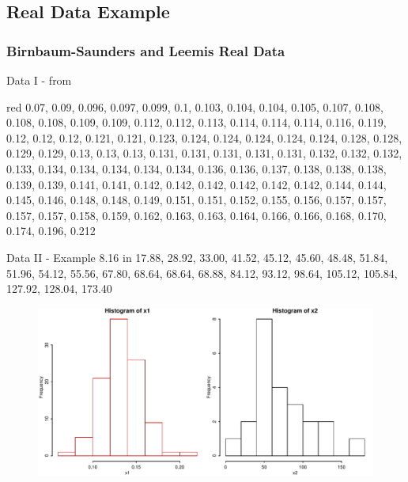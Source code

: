 \subsection{Real Data Example}
\begin{frame}
  \frametitle{Birnbaum-Saunders and Leemis Real Data}
\begin{footnotesize}
\begin{block}{Data I  - from  }
\begin{color}{red}
0.07, 0.09, 0.096, 0.097, 0.099, 0.1, 0.103, 0.104, 0.104,
0.105, 0.107, 0.108, 0.108, 0.108, 0.109, 0.109, 0.112, 0.112,
0.113, 0.114, 0.114, 0.114, 0.116, 0.119, 0.12, 0.12, 0.12, 0.121,
0.121, 0.123, 0.124, 0.124, 0.124, 0.124, 0.124, 0.128, 0.128,
0.129, 0.129, 0.13, 0.13, 0.13, 0.131, 0.131, 0.131, 0.131, 0.131,
0.132, 0.132, 0.132, 0.133, 0.134, 0.134, 0.134, 0.134, 0.134,
0.136, 0.136, 0.137, 0.138, 0.138, 0.138, 0.139, 0.139, 0.141,
0.141, 0.142, 0.142, 0.142, 0.142, 0.142, 0.142, 0.144, 0.144,
0.145, 0.146, 0.148, 0.148, 0.149, 0.151, 0.151, 0.152, 0.155,
0.156, 0.157, 0.157, 0.157, 0.157, 0.158, 0.159, 0.162, 0.163,
0.163, 0.164, 0.166, 0.166, 0.168, 0.170, 0.174, 0.196, 0.212
\end{color}
\end{block}

\begin{block}{Data II - Example 8.16 in }
17.88, 28.92, 33.00, 41.52, 45.12, 45.60, 48.48, 51.84, 51.96,
         54.12, 55.56, 67.80, 68.64, 68.64, 68.88, 84.12, 93.12, 98.64,
        105.12, 105.84, 127.92, 128.04, 173.40
\end{block}
\end{footnotesize}
\end{frame}

\begin{frame}   %
\begin{figure}[h]
   \includegraphics[width=4.5in]{hist4.pdf} %
   \vspace{-3ex}
\end{figure}
\end{frame}

